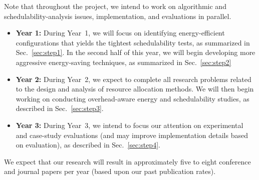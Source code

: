 Note that throughout the project, we intend to work on algorithmic and schedulability-analysis issues, implementation, and evaluations in parallel.
\vspace{-2mm}

\begin{itemize}\itemsep 0pt \parskip 0pt
\item \textbf{Year 1:} During Year~1, we will focus on identifying energy-efficient configurations that yields the tightest schedulability tests, as summarized in Sec.~\ref{sec:step1}. In the second half of this year, we will begin  developing more aggressive energy-saving techniques, as summarized in Sec.~\ref{sec:step2}
\item \textbf{Year 2:} During Year~2, we expect to complete all research problems related to the design and analysis of resource allocation methods. We will then begin working on conducting overhead-aware energy and schedulability studies, as described in Sec.~\ref{sec:step3}.
\item \textbf{Year 3:} During Year~3, we intend to focus our attention on experimental and case-study evaluations (and  may improve implementation details based on evaluation), as described in Sec.~\ref{sec:step4}.
\end{itemize}

\vspace{-2mm}
We expect that our research will result in approximately five to eight conference and journal papers per year (based upon our past publication rates).
